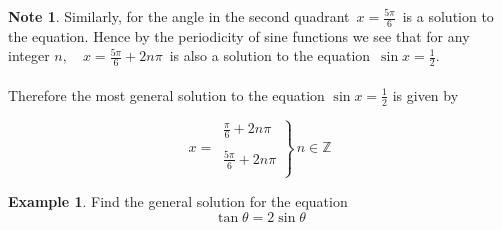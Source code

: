 \documentclass[11pt,a4paper]{article}
\theoremstyle{definition}
\newtheorem{example}[thm]{Example}
\newtheorem{note}[thm]{Note}
\begin{document}
\begin{note}
Similarly, for the angle in the second quadrant $\, x = \frac{5\pi}{6}\,$ is a solution to the equation. Hence by the periodicity of sine functions we see that for any integer $n,\quad  x = \frac{5\pi}{6} + 2n\pi\,$ is also a solution to the equation $\, \sin x = \frac{1}{2}$.\\\\



Therefore the most general solution to the equation $\sin x=\frac{1}{2}$ is given by
 
$$
x =\, \left.\begin{aligned}
\frac{\pi}{6} + 2n\pi\\\\
\frac{5\pi}{6} + 2n\pi\\
\end{aligned}
\right\}\, n \in \mathbb{Z}
$$
\end{note}
\begin{example}

Find the general solution for the equation $$\tan \theta = 2\sin \theta$$
\end{example}
\end{document}
